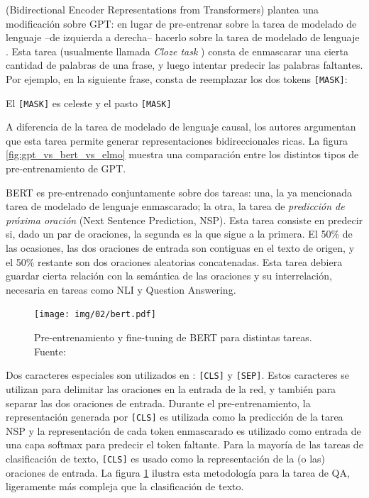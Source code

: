 \bert{} \cite{devlin2018bert} (Bidirectional Encoder Representations from Transformers) plantea una modificación sobre GPT: en lugar de pre-entrenar sobre la tarea de modelado de lenguaje  --de izquierda a derecha-- hacerlo sobre la tarea de modelado de lenguaje . Esta tarea (usualmente llamada \emph{Cloze task} \cite{taylor1953cloze}) consta de enmascarar una cierta cantidad de palabras de una frase, y luego intentar predecir las palabras faltantes. Por ejemplo, en la siguiente frase, consta de reemplazar los dos tokens \verb|[MASK]|:

\begin{center}
    El \verb|[MASK]| es celeste y el pasto \verb|[MASK]|
\end{center}


A diferencia de la tarea de modelado de lenguaje causal, los autores argumentan que esta tarea permite generar representaciones bidireccionales ricas. La figura \ref{fig:gpt_vs_bert_vs_elmo} muestra una comparación entre los distintos tipos de pre-entrenamiento de GPT.

BERT es pre-entrenado conjuntamente sobre dos tareas: una, la ya mencionada tarea de modelado de lenguaje enmascarado; la otra, la tarea de \emph{predicción de próxima oración} (Next Sentence Prediction, NSP). Esta tarea consiste en predecir si, dado un par de oraciones, la segunda es la que sigue a la primera. El 50\% de las ocasiones, las dos oraciones de entrada son contiguas en el texto de origen, y el 50\% restante son dos oraciones aleatorias concatenadas. Esta tarea debiera guardar cierta relación con la semántica de las oraciones y su interrelación, necesaria en tareas como NLI y Question Answering.

\newcommand{\clstok}[0]{\texttt{[CLS]}}
\newcommand{\septok}[0]{\texttt{[SEP]}}

\begin{figure}[t]
    \centering
    \texttt{[image: img/02/bert.pdf]}
    \caption{Pre-entrenamiento y fine-tuning de BERT para distintas tareas. Fuente: \citet{devlin2018bert}}
    \label{fig:bert_pretraining_and_finetuning}
\end{figure}

Dos caracteres especiales son utilizados en \bert{}: \clstok{} y \septok{}. Estos caracteres se utilizan para delimitar las oraciones en la entrada de la red, y también para separar las dos oraciones de entrada. Durante el pre-entrenamiento, la representación generada por \clstok{} es utilizada como la predicción de la tarea NSP y la representación de cada token enmascarado es utilizado como entrada de una capa softmax para predecir el token faltante. Para la mayoría de las tareas de clasificación de texto, \clstok{} es usado como la representación de la (o las) oraciones de entrada. La figura \ref{fig:bert_pretraining_and_finetuning} ilustra esta metodología para la tarea de QA, ligeramente más compleja que la clasificación de texto.

